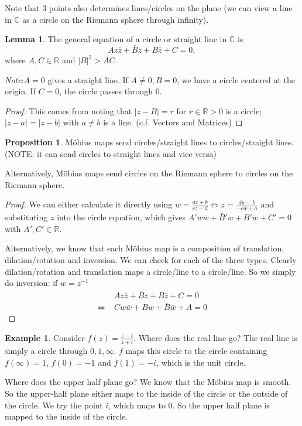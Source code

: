 \documentclass[a4paper]{article}
\theoremstyle{definition}
\newtheorem*{prop}{Proposition}
\newtheorem*{eg}{Example}
\newtheorem*{lemma}{Lemma}
\newcommand{\note}{\noindent \emph{Note}:\;}
\newcommand{\R}{\mathbb{R}}
\newcommand{\C}{\mathbb{C}}
\begin{document}
Note that 3 points also determines lines/circles on the plane (we can view a line in $\C$ as a circle on the Riemann sphere through infinity).

\begin{lemma}
  The general equation of a circle or straight line in $\C$ is
  \[
  Az\bar z + \bar Bz + B\bar z + C = 0,
  \]
where $A, C\in \R$ and $|B|^2 > AC$.
\end{lemma}
\note $A = 0$ gives a straight line. If $A \not= 0, B = 0$, we have a circle centered at the origin. If $C = 0$, the circle passes through 0.

\begin{proof}
  This comes from noting that $|z - B| = r$ for $r \in \R> 0$ is a circle; $|z - a| = |z - b|$ with $a\not= b $ is a line. (c.f. Vectors and Matrices)
\end{proof}

\begin{prop}
  M\"obius maps send circles/straight lines to circles/straight lines. (NOTE: it can send circles to straight lines and vice versa)

  Alternatively, M\"obius maps send circles on the Riemann sphere to circles on the Riemann sphere.
\end{prop}

\begin{proof}
  We can either calculate it directly using $w = \frac{az + b}{cz + d}\Leftrightarrow z = \frac{dw - b}{-cw + a}$ and substituting $z$ into the circle equation, which gives $A' w\bar w + \bar B' w + B'\bar w + C' = 0$ with $A', C'\in \R$.

  Alternatively, we know that each M\"obius map is a composition of translation, dilation/rotation and inversion. We can check for each of the three types. Clearly dilation/rotation and translation maps a circle/line to a circle/line. So we simply do inversion: if $w = z^{-1}$
  \begin{align*}
    &\; Az\bar z + \bar Bz + B\bar z + C = 0\\
    \Leftrightarrow &\;  Cw\bar w + Bw + \bar B\bar w + A = 0
  \end{align*}
\end{proof}

\begin{eg}
  Consider $f(z) = \frac{z - i}{z + i}$. Where does the real line go? The real line is simply a circle through $0, 1, \infty$. $f$ maps this circle to the circle containing $f(\infty) = 1$, $f(0) = -1$ and $f(1) = -i$, which is the unit circle.

Where does the upper half plane go? We know that the M\"obius map is smooth. So the upper-half plane either maps to the inside of the circle or the outside of the circle. We try the point $i$, which maps to $0$. So the upper half plane is mapped to the inside of the circle.
\end{eg}
\end{document}
